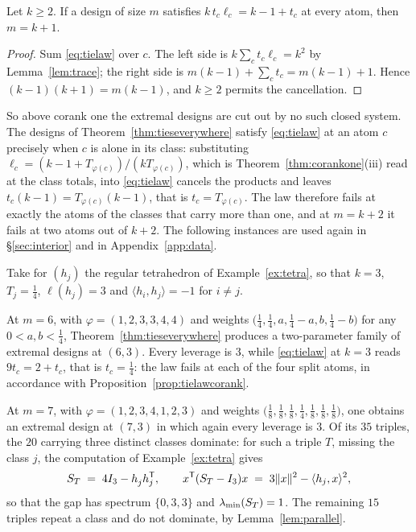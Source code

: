 \begin{proposition}[Lean]\label{prop:tielawcorank}
Let $k\ge2$.  If a design of size $m$ satisfies $k\,t_c\ell_c=k-1+t_c$ at
every atom, then $m=k+1$.
\end{proposition}

\begin{proof}
Sum \eqref{eq:tielaw} over $c$.  The left side is
$k\sum_ct_c\ell_c=k^{2}$ by Lemma~\ref{lem:trace}; the right side is
$m(k-1)+\sum_ct_c=m(k-1)+1$.  Hence $(k-1)(k+1)=m(k-1)$, and $k\ge2$
permits the cancellation.
\end{proof}

So above corank one the extremal designs are cut out by no such closed
system.  The designs of Theorem~\ref{thm:tieseverywhere} satisfy
\eqref{eq:tielaw} at an atom $c$ precisely when $c$ is alone in its class:
substituting $\ell_c=(k-1+T_{\varphi(c)})/(kT_{\varphi(c)})$, which is
Theorem~\ref{thm:corankone}(iii) read at the class totals, into
\eqref{eq:tielaw} cancels the products and leaves
$t_c(k-1)=T_{\varphi(c)}(k-1)$, that is $t_c=T_{\varphi(c)}$.  The law
therefore fails at exactly the atoms of the classes that carry more than
one, and at $m=k+2$ it fails at two atoms out of $k+2$.  The following
instances are used again in \S\ref{sec:interior} and in
Appendix~\ref{app:data}.

\begin{example}[Lean]\label{ex:split}
Take for $(h_j)$ the regular tetrahedron of Example~\ref{ex:tetra}, so
that $k=3$, $T_j=\tfrac14$, $\ell(h_j)=3$ and
$\langle h_i,h_j\rangle=-1$ for $i\ne j$.

At $m=6$, with $\varphi=(1,2,3,3,4,4)$ and weights
$\bigl(\tfrac14,\tfrac14,a,\tfrac14-a,b,\tfrac14-b\bigr)$ for any
$0<a,b<\tfrac14$, Theorem~\ref{thm:tieseverywhere} produces a
two-parameter family of extremal designs at $(6,3)$.  Every leverage is
$3$, while \eqref{eq:tielaw} at $k=3$ reads $9t_c=2+t_c$, that is
$t_c=\tfrac14$: the law fails at each of the four split atoms, in
accordance with Proposition~\ref{prop:tielawcorank}.

At $m=7$, with $\varphi=(1,2,3,4,1,2,3)$ and weights
$\bigl(\tfrac18,\tfrac18,\tfrac18,\tfrac14,\tfrac18,\tfrac18,
\tfrac18\bigr)$, one obtains an extremal design at $(7,3)$ in which again
every leverage is $3$.  Of its $35$ triples, the $20$ carrying three
distinct classes dominate: for such a triple $T$, missing the class $j$,
the computation of Example~\ref{ex:tetra} gives
\[
  S_T\;=\;4I_3-h_j^{\vphantom{\mathsf{T}}}h_j\tp,
  \qquad
  x\tp(S_T-I_3)x\;=\;3\lVert x\rVert^{2}-\langle h_j,x\rangle^{2},
\]
so that the gap has spectrum $\{0,3,3\}$ and $\lambda_{\min}(S_T)=1$.  The
remaining $15$ triples repeat a class and do not dominate, by
Lemma~\ref{lem:parallel}.
\end{example}

